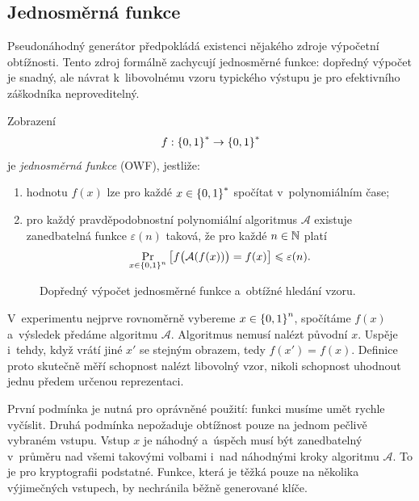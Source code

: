 
\subsection{Jednosměrná funkce}

Pseudonáhodný generátor předpokládá existenci nějakého zdroje výpočetní obtížnosti. Tento zdroj formálně zachycují jednosměrné funkce: dopředný výpočet je snadný, ale návrat k~libovolnému vzoru typického výstupu je pro efektivního záškodníka neproveditelný.

\begin{definition}\label{def:krypto-owf}
    Zobrazení
    \[
        f:\left\{0,1\right\}^{*} \rightarrow \left\{0,1\right\}^{*}
    \]
    je \emph{jednosměrná funkce} (OWF), jestliže:
    \begin{enumerate}
        \item hodnotu $f(x)$ lze pro každé $x\in\left\{0,1\right\}^{*}$ spočítat v~polynomiálním čase;
        \item pro každý pravděpodobnostní polynomiální algoritmus $\mathcal A$ existuje zanedbatelná funkce $\varepsilon(n)$ taková, že pro každé $n\in\mathbb{N}$ platí
        \[
            \Pr_{x\in\left\{0,1\right\}^{n}}
            \left[
                f\bigl(\mathcal A(f(x))\bigr)=f(x)
            \right]
            \leqslant\varepsilon(n).
        \]
    \end{enumerate}
\end{definition}

\begin{figure}[ht]
    \centering
    
    \caption{Dopředný výpočet jednosměrné funkce a~obtížné hledání vzoru.}
    \label{fig:krypto-owf}
\end{figure}

V~experimentu nejprve rovnoměrně vybereme $x\in\left\{0,1\right\}^{n}$, spočítáme $f(x)$ a~výsledek předáme algoritmu $\mathcal A$. Algoritmus nemusí nalézt původní $x$. Uspěje i~tehdy, když vrátí jiné $x'$ se stejným obrazem, tedy $f(x')=f(x)$. Definice proto skutečně měří schopnost nalézt libovolný vzor, nikoli schopnost uhodnout jednu předem určenou reprezentaci.

První podmínka je nutná pro oprávněné použití: funkci musíme umět rychle vyčíslit. Druhá podmínka nepožaduje obtížnost pouze na jednom pečlivě vybraném vstupu. Vstup $x$ je náhodný a~úspěch musí být zanedbatelný v~průměru nad všemi takovými volbami i~nad náhodnými kroky algoritmu $\mathcal A$. To je pro kryptografii podstatné. Funkce, která je těžká pouze na několika výjimečných vstupech, by nechránila běžně generované klíče.


